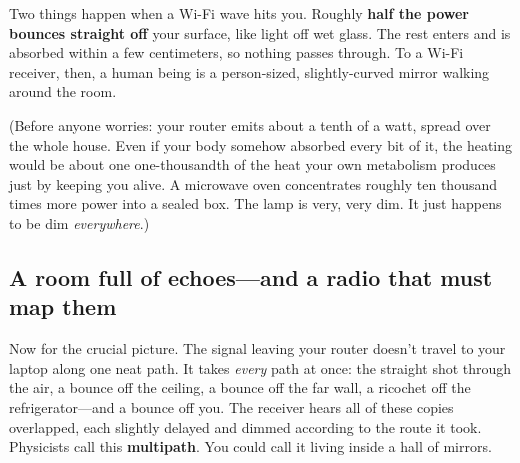 \documentclass[11pt, letterpaper]{article}
\begin{document}
Two things happen when a Wi-Fi wave hits you. Roughly \textbf{half the power bounces straight off} your surface, like light off wet glass. The rest enters and is absorbed within a few centimeters, so nothing passes through. To a Wi-Fi receiver, then, a human being is a person-sized, slightly-curved mirror walking around the room.

(Before anyone worries: your router emits about a tenth of a watt, spread over the whole house. Even if your body somehow absorbed every bit of it, the heating would be about one one-thousandth of the heat your own metabolism produces just by keeping you alive. A microwave oven concentrates roughly ten thousand times more power into a sealed box. The lamp is very, very dim. It just happens to be dim \textit{everywhere}.)

\subsection{A room full of echoes---and a radio that must map them}

Now for the crucial picture. The signal leaving your router doesn't travel to your laptop along one neat path. It takes \textit{every} path at once: the straight shot through the air, a bounce off the ceiling, a bounce off the far wall, a ricochet off the refrigerator---and a bounce off you. The receiver hears all of these copies overlapped, each slightly delayed and dimmed according to the route it took. Physicists call this \textbf{multipath}. You could call it living inside a hall of mirrors.
\end{document}
